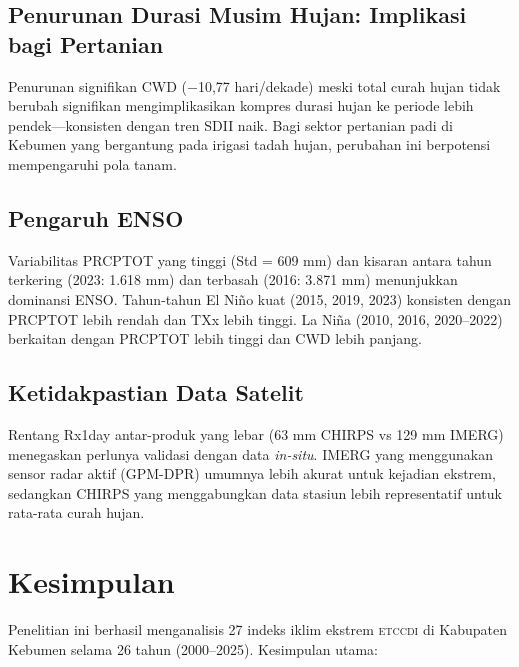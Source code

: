 \documentclass[12pt, a4paper]{article}
\newcommand{\etccdi}{\textsc{etccdi}}
\begin{document}
\subsection{Penurunan Durasi Musim Hujan: Implikasi bagi Pertanian}

Penurunan signifikan CWD ($-$10,77 hari/dekade) meski total curah hujan tidak berubah signifikan mengimplikasikan kompres durasi hujan ke periode lebih pendek---konsisten dengan tren SDII naik. Bagi sektor pertanian padi di Kebumen yang bergantung pada irigasi tadah hujan, perubahan ini berpotensi mempengaruhi pola tanam.

\subsection{Pengaruh ENSO}

Variabilitas PRCPTOT yang tinggi (Std = 609 mm) dan kisaran antara tahun terkering (2023: 1.618 mm) dan terbasah (2016: 3.871 mm) menunjukkan dominansi ENSO. Tahun-tahun El Ni\~{n}o kuat (2015, 2019, 2023) konsisten dengan PRCPTOT lebih rendah dan TXx lebih tinggi. La Ni\~{n}a (2010, 2016, 2020--2022) berkaitan dengan PRCPTOT lebih tinggi dan CWD lebih panjang.

\subsection{Ketidakpastian Data Satelit}

Rentang Rx1day antar-produk yang lebar (63 mm CHIRPS vs 129 mm IMERG) menegaskan perlunya validasi dengan data \textit{in-situ}. IMERG yang menggunakan sensor radar aktif (GPM-DPR) umumnya lebih akurat untuk kejadian ekstrem, sedangkan CHIRPS yang menggabungkan data stasiun lebih representatif untuk rata-rata curah hujan.

\section{Kesimpulan}

Penelitian ini berhasil menganalisis 27 indeks iklim ekstrem \etccdi{} di Kabupaten Kebumen selama 26 tahun (2000--2025). Kesimpulan utama:
\end{document}
